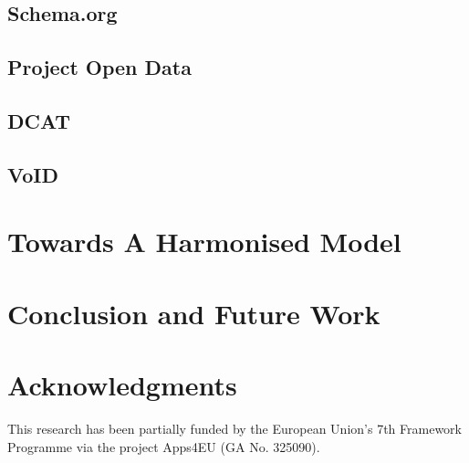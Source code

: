 \documentclass[runningheads,a4paper]{llncs}
\begin{document}
\subsection{Schema.org}

\subsection{Project Open Data}

\subsection{DCAT}

\subsection{VoID}


\section{Towards A Harmonised Model}
\label{sec:hdl}


\section{Conclusion and Future Work}
\label{sec:conclusion}


\section*{Acknowledgments}
This research has been partially funded by the European Union's 7th Framework Programme via the project Apps4EU (GA No. 325090).
\vspace{0.5cm}


\nocite{*}

\end{document}
